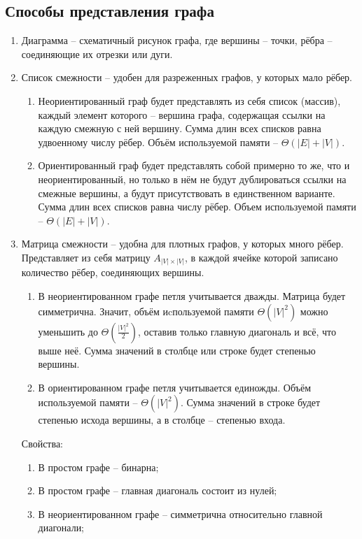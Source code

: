 \documentclass[a4paper,12pt]{article}
\begin{document}
\subsection*{Способы представления графа}

\begin{enumerate}
    \item Диаграмма -- схематичный рисунок графа, где вершины -- точки, рёбра -- соединяющие их отрезки или дуги.
    \item Список смежности -- удобен для разреженных графов, у которых мало рёбер.
    \begin{enumerate}
        \item Неориентированный граф будет представлять из себя список (массив), каждый элемент которого -- вершина графа, содержащая ссылки на каждую смежную с ней вершину. Сумма длин всех списков равна удвоенному числу рёбер. Объём используемой памяти -- $\Theta(|E| + |V|)$.
        \item Ориентированный граф будет представлять собой примерно то же, что и неориентированный, но только в нём не будут дублироваться ссылки на смежные вершины, а будут присутствовать в единственном варианте. Сумма длин всех списков равна числу рёбер. Объем используемой памяти -- $\Theta(|E| + |V|)$.
    \end{enumerate}
    \item Матрица смежности -- удобна для плотных графов, у которых много рёбер. Представляет из себя матрицу $A_{|V| \times |V|}$, в каждой ячейке которой записано количество рёбер, соединяющих вершины.
    \begin{enumerate}
        \item В неориентированном графе петля учитывается дважды. Матрица будет симметрична. Значит, объём иcпользуемой памяти $\Theta(|V|^2)$ можно уменьшить до $\Theta\left(\frac{|V|^2}{2}\right)$, оставив только главную диагональ и всё, что выше неё. Сумма значений в столбце или строке будет степенью вершины.
        \item В ориентированном графе петля учитывается единожды. Объём используемой памяти -- $\Theta(|V|^2)$. Сумма значений в строке будет степенью исхода вершины, а в столбце -- степенью входа.
    \end{enumerate}
    Свойства:
    \begin{enumerate}
        \item В простом графе -- бинарна;
        \item В простом графе -- главная диагональ состоит из нулей;
        \item В неориентированном графе -- симметрична относительно главной диагонали;

\end{enumerate}
\end{enumerate}
\end{document}
